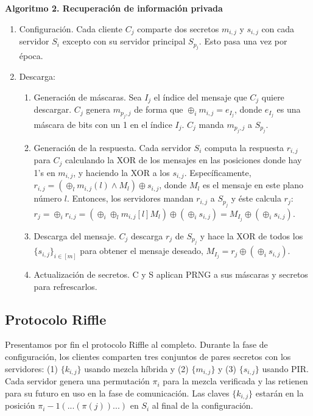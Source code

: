 \begin{enumerate}
\textbf{Algoritmo 2. Recuperación de información privada}
\begin{enumerate}
	\item Configuración. Cada cliente $C_j$ comparte dos secretos $m_{i,j}$ y $s_{i,j}$  con cada servidor $S_i$ excepto con su servidor principal $S_{p_j}$. Esto pasa una vez por época.
	\item Descarga:
	\begin{enumerate}
		\item Generación de máscaras. Sea $I_j$ el índice del mensaje que $C_j$ quiere descargar. $C_j$ genera $m_{p_j,j}$ de forma que $\oplus _i m_{i,j} = e_{I_j}$, donde $e_{I_j}$ es una máscara de bits con un 1 en el índice $I_j$. $C_j$ manda $m_{p_j,j}$ a $S_{p_j}$.
		\item Generación de la respuesta. Cada servidor $S_i$ computa la respuesta $r_{i,j}$ para $C_j$ calculando la XOR de los mensajes en las posiciones donde hay 1's en $m_{i,j}$, y haciendo la XOR a los $s_{i,j}$. Específicamente, $r_{i,j} = (\oplus _l m_{i,j}(l) \land M_l) \oplus s_{i,j}$, donde $M_l$ es el mensaje en este plano número $l$. Entonces, los servidores mandan $r_{i,j}$ a $S_{p_j}$ y éste calcula $r_j$:
		$r_j=\oplus _i r_{i,j} = (\oplus _i \oplus _l m_{i,j}[l] M_l) \oplus (\oplus _i s_{i,j}) = M_{I_j} \oplus (\oplus _i s_{i,j})$.
		\item Descarga del mensaje. $C_j$ descarga $r_j$ de $S_{p_j}$ y hace la XOR de todos los $\{s_{i,j}\}_{i \in [m]}$ para obtener el mensaje deseado, $M_{I_j}= r_j \oplus (\oplus _i s_{i,j})$.
		\item Actualización de secretos. C y S aplican PRNG a sus máscaras y secretos para refrescarlos. 
	\end{enumerate}
\end{enumerate}

\subsection{Protocolo Riffle}
Presentamos por fin el protocolo Riffle al completo. Durante la fase de configuración, los clientes comparten tres conjuntos de pares secretos con los servidores: (1) $\{k_{i,j}\}$ usando mezcla híbrida y (2) $\{m_{i,j}\}$ y (3) $\{s_{i,j}\}$ usando PIR. Cada servidor genera una permutación $\pi_i$ para la mezcla verificada y las retienen para su futuro en uso en la fase de comunicación. Las claves $\{k_{i,j}\}$ estarán en la posición $\pi_i-1(...(\pi(j))...)$ en $S_i$ al final de la configuración. 


\end{enumerate}
